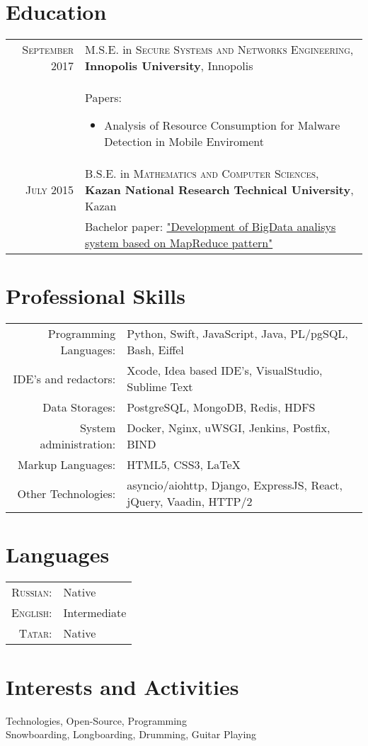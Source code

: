 \documentclass[a4paper,10pt]{article}
\begin{document}
\section{Education}
\begin{tabular}{r p{11cm}}	
 \textsc{September} 2017 & M.S.E. in \textsc{Secure Systems and Networks Engineering}, \textbf{Innopolis University}, Innopolis\\
 & Papers:
 \begin{itemize}
    \item Analysis of Resource Consumption for Malware Detection in Mobile Enviroment
 \end{itemize}\\
 \textsc{July} 2015 & B.S.E. in \textsc{Mathematics and Computer Sciences}, \textbf{Kazan National Research Technical University}, Kazan\\
 & Bachelor paper: \href{https://github.com/litleleprikon/bachelor\_paper}{"Development of BigData analisys system based on MapReduce pattern"}\\
\end{tabular}

\section{Professional Skills}
\begin{tabular}{r p{11cm}}

 Programming Languages:& Python, Swift, JavaScript, Java, PL/pgSQL, Bash, Eiffel \\
 IDE's and redactors:& Xcode, Idea based IDE's, VisualStudio, Sublime Text\\
 Data Storages:& PostgreSQL, MongoDB, Redis, HDFS \\
 System administration:& Docker, Nginx, uWSGI, Jenkins, Postfix, BIND\\
 Markup Languages:& HTML5, CSS3, \LaTeX \\
 Other Technologies:& asyncio/aiohttp, Django, ExpressJS, React, jQuery, Vaadin, HTTP/2
 
\end{tabular}

\section{Languages}
\begin{tabular}{r p{11cm}}
 \textsc{Russian:}&Native\\
\textsc{English:}&Intermediate\\
\textsc{Tatar:}&Native\\
\end{tabular}

\section{Interests and Activities}
Technologies, Open-Source, Programming\\
Snowboarding, Longboarding, Drumming, Guitar Playing
\end{document}

